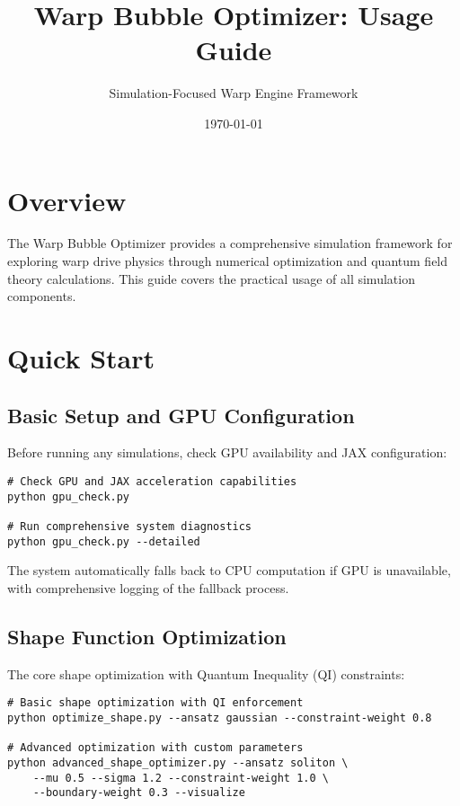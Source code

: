 \documentclass{article}
\title{Warp Bubble Optimizer: Usage Guide}
\author{Simulation-Focused Warp Engine Framework}
\date{\today}
\begin{document}
\maketitle

\section{Overview}

The Warp Bubble Optimizer provides a comprehensive simulation framework for exploring warp drive physics through numerical optimization and quantum field theory calculations. This guide covers the practical usage of all simulation components.

\section{Quick Start}

\subsection{Basic Setup and GPU Configuration}

Before running any simulations, check GPU availability and JAX configuration:

\begin{lstlisting}
# Check GPU and JAX acceleration capabilities
python gpu_check.py

# Run comprehensive system diagnostics
python gpu_check.py --detailed
\end{lstlisting}

The system automatically falls back to CPU computation if GPU is unavailable, with comprehensive logging of the fallback process.

\subsection{Shape Function Optimization}

The core shape optimization with Quantum Inequality (QI) constraints:

\begin{lstlisting}
# Basic shape optimization with QI enforcement
python optimize_shape.py --ansatz gaussian --constraint-weight 0.8

# Advanced optimization with custom parameters
python advanced_shape_optimizer.py --ansatz soliton \
    --mu 0.5 --sigma 1.2 --constraint-weight 1.0 \
    --boundary-weight 0.3 --visualize
\end{lstlisting}
\end{document}
